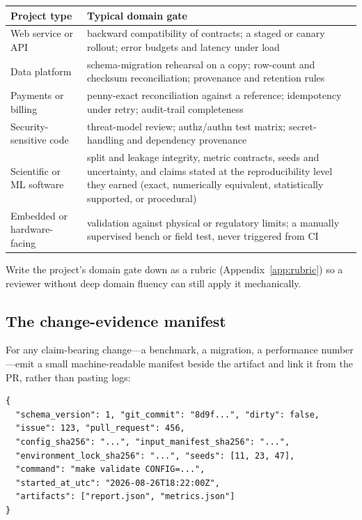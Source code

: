 \documentclass[11pt]{article}
\begin{document}
\begin{center}
\begin{tabularx}{\textwidth}{@{}l Y@{}}
\toprule
\textbf{Project type} & \textbf{Typical domain gate} \\
\midrule
Web service or API & backward compatibility of contracts; a staged or canary rollout; error
  budgets and latency under load \\
Data platform & schema-migration rehearsal on a copy; row-count and checksum reconciliation;
  provenance and retention rules \\
Payments or billing & penny-exact reconciliation against a reference; idempotency under retry;
  audit-trail completeness \\
Security-sensitive code & threat-model review; authz/authn test matrix; secret-handling and
  dependency provenance \\
Scientific or ML software & split and leakage integrity, metric contracts, seeds and
  uncertainty, and claims stated at the reproducibility level they earned (exact, numerically
  equivalent, statistically supported, or procedural) \\
Embedded or hardware-facing & validation against physical or regulatory limits; a
  manually supervised bench or field test, never triggered from CI \\
\bottomrule
\end{tabularx}
\end{center}

Write the project's domain gate down as a rubric (Appendix~\ref{app:rubric}) so a reviewer
without deep domain fluency can still apply it mechanically.

\subsection{The change-evidence manifest}

For any claim-bearing change---a benchmark, a migration, a performance number---emit a small
machine-readable manifest beside the artifact and link it from the PR, rather than pasting logs:

\begin{lstlisting}[style=gw]
{
  "schema_version": 1, "git_commit": "8d9f...", "dirty": false,
  "issue": 123, "pull_request": 456,
  "config_sha256": "...", "input_manifest_sha256": "...",
  "environment_lock_sha256": "...", "seeds": [11, 23, 47],
  "command": "make validate CONFIG=...",
  "started_at_utc": "2026-08-26T18:22:00Z",
  "artifacts": ["report.json", "metrics.json"]
}
\end{lstlisting}
\end{document}
